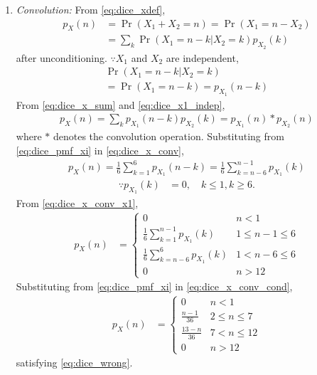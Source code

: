 \documentclass{article}
\numberwithin{equation}{subsection}
\numberwithin{figure}{subsection}
\providecommand{\pr}[1]{\ensuremath{\Pr\left(#1\right)}}
\renewcommand\thesection{\arabic{section}}
\renewcommand\thesubsection{\thesection.\arabic{subsection}}
\begin{document}
\begin{enumerate}[label=\thesubsection.\arabic*.,ref=\thesubsection.\arabic{figure}]
\item {\em Convolution: }
From \eqref{eq:dice_xdef},
\begin{align}
p_X(n) &= \pr{X_1 + X_2 = n} = \pr{X_1  = n -X_2}
\\
&= \sum_{k}^{}\pr{X_1  = n -k | X_2 = k}p_{X_2}(k)
\label{eq:dice_x_sum}
\end{align}
after unconditioning.  $\because X_1$ and $X_2$ are independent,
\begin{multline}
\pr{X_1  = n -k | X_2 = k} 
\\
= \pr{X_1  = n -k} = p_{X_1}(n-k)
\label{eq:dice_x1_indep}
\end{multline}
From \eqref{eq:dice_x_sum} and \eqref{eq:dice_x1_indep},
\begin{align}
p_X(n) = \sum_{k}^{}p_{X_1}(n-k)p_{X_2}(k) = p_{X_1}(n)*p_{X_2}(n)
\label{eq:dice_x_conv}
\end{align}
where $*$ denotes the convolution operation. 
Substituting from \eqref{eq:dice_pmf_xi}
in \eqref{eq:dice_x_conv},
\begin{align}
p_X(n) = \frac{1}{6}\sum_{k=1}^{6}p_{X_1}(n-k)= \frac{1}{6}\sum_{k=n-6}^{n-1}p_{X_1}(k)
\label{eq:dice_x_conv_x1}
\end{align}
\begin{align}
\because p_{X_1}(k) &= 0, \quad k \le 1, k \ge 6.
\end{align}
From \eqref{eq:dice_x_conv_x1},
%
\begin{align}
p_X(n) &= 
\begin{cases}
0 & n < 1
\\
\frac{1}{6}\sum_{k=1}^{n-1}p_{X_1}(k) &  1 \le n-1 \le  6
\\
\frac{1}{6}\sum_{k=n-6}^{6}p_{X_1}(k) & 1 < n-6 \le 6
\\
0 & n > 12
\end{cases}
\label{eq:dice_x_conv_cond}
\end{align}
Substituting from \eqref{eq:dice_pmf_xi} in \eqref{eq:dice_x_conv_cond},
\begin{align}
p_X(n) &= 
\begin{cases}
0 & n < 1
\\
\frac{n-1}{36} &  2 \le n \le  7
\\
\frac{13-n}{36} & 7 < n \le 12
\\
0 & n > 12
\end{cases}
\label{eq:dice_x_conv_final}
\end{align}
satisfying \eqref{eq:dice_wrong}.
\begin{flushleft}

\end{flushleft}
\end{enumerate}
\end{document}
